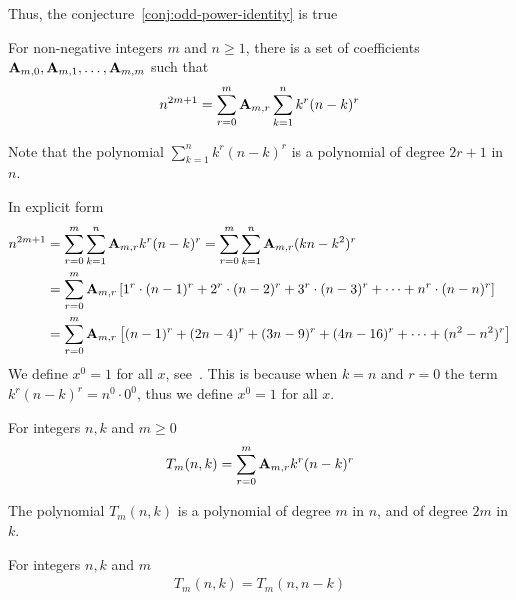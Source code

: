 Thus, the conjecture~\eqref{conj:odd-power-identity} is true
\begin{theorem}
    \label{theorem:odd-power-identity}
    For non-negative integers $m$ and $n \geq 1$,
    there is a set of coefficients ${\mathbf{A}} \sb{m,0}, {\mathbf{A}} \sb{m,1}, \ldots, {\mathbf{A}} \sb{m,m}$ such that
    \begin{align*}
        n^{2m+1} = \sum_{r=0}^{m} {\mathbf{A}} \sb{m,r} \sum_{k=1}^{n} k^r (n-k)^r
    \end{align*}
\end{theorem}
Note that the polynomial $\sum_{k=1}^{n} k^r (n-k)^r$ is a polynomial of degree $2r+1$ in $n$.

In explicit form
\begin{align*}
    n^{2m+1}
    &= \sum_{r=0}^{m} \sum_{k=1}^{n} {\mathbf{A}} \sb{m,r} k^r (n-k)^r = \sum_{r=0}^{m} \sum_{k=1}^{n} {\mathbf{A}} \sb{m,r} (kn-k^2)^r \\
    &= \sum_{r=0}^{m} {\mathbf{A}} \sb{m,r} \left[ 1^r \cdot (n-1)^r + 2^r \cdot (n-2)^r + 3^r \cdot (n-3)^r + \cdots + n^r \cdot (n-n)^r  \right] \\
    &= \sum_{r=0}^{m} {\mathbf{A}} \sb{m,r} \left[ (n-1)^r + (2n-4)^r + (3n-9)^r + (4n-16)^r + \cdots +  (n^2-n^2)^r  \right]
\end{align*}
We define $x^0 = 1$ for all $x$, see~\cite[~p. 162]{graham1994concrete}.
This is because when $k=n$ and $r=0$ the term $k^r (n-k)^r = n^0 \cdot 0^0$, thus we define $x^0 = 1$
for all $x$.

\begin{definition}
    For integers $n,k$ and $m \geq 0$
    \label{def:bivariate-sum-Tm}
    \begin{align*}
        T_{m}(n,k) = \sum_{r=0}^{m} {\mathbf{A}} \sb{m,r} k^r (n-k)^r
    \end{align*}
\end{definition}
The polynomial $T_m(n,k)$ is a polynomial of degree $m$ in $n$, and of degree $2m$ in $k$.
\begin{proposition}[Symmetry of $T_m$]
    \label{prop:Tm-symmetry}
    For integers $n, k$ and $m$
    \begin{align*}
        T_{m} (n, k) = T_{m} (n, n-k)
    \end{align*}
\end{proposition}









